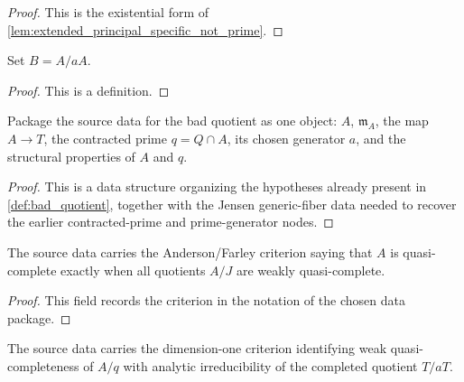 \begin{proof}
  This is the existential form of
  \cref{lem:extended_principal_specific_not_prime}.
\end{proof}

\begin{definition}
  \label{def:bad_quotient}
  Set \(B=A/aA\).
\end{definition}

\begin{proof}
  This is a definition.
\end{proof}

\begin{definition}
  \label{def:bad_quotient_source_data}
  Package the source data for the bad quotient as one object:
  \(A\), \(\mathfrak m_A\), the map \(A\to T\), the contracted prime
  \(q=Q\cap A\), its chosen generator \(a\), and the structural properties of
  \(A\) and \(q\).
\end{definition}

\begin{proof}
  This is a data structure organizing the hypotheses already present in
  \cref{def:bad_quotient}, together with the Jensen generic-fiber data needed
  to recover the earlier contracted-prime and prime-generator nodes.
\end{proof}

\begin{definition}
  \label{def:bad_quotient_quasi_criterion_field}
  The source data carries the Anderson/Farley criterion saying that
  \(A\) is quasi-complete exactly when all quotients \(A/J\) are weakly
  quasi-complete.
\end{definition}

\begin{proof}
  This field records the criterion in the notation of the chosen data package.
\end{proof}

\begin{definition}
  \label{def:bad_quotient_dimension_criterion_field}
  The source data carries the dimension-one criterion identifying weak
  quasi-completeness of \(A/q\) with analytic irreducibility of the completed
  quotient \(T/aT\).
\end{definition}

